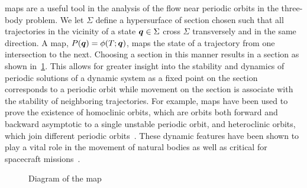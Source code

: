 \documentclass[smallcondensed]{svjour3}
\begin{document}
\Poincare maps are a useful tool in the analysis of the flow near periodic orbits in the three-body problem.
We let \( \Sigma \) define a hypersurface of section chosen such that all trajectories in the vicinity of a state \( \bm{q} \in \Sigma \) cross \( \Sigma \) transversely and in the same direction.
A \Poincare map, \( P(\bm{q}) = \phi(T;\bm{q}) \), maps the state of a trajectory from one intersection to the next.
Choosing a section in this manner results in a \Poincare section as shown in~\cref{fig:poincare_map}.
This allows for greater insight into the stability and dynamics of periodic solutions of a dynamic system as a fixed point on the \Poincare section corresponds to a periodic orbit while movement on the section is associate with the stability of neighboring trajectories. 
For example, \Poincare maps have been used to prove the existence of homoclinic orbits, which are orbits both forward and backward asymptotic to a single unstable periodic orbit, and heteroclinic orbits, which join different periodic orbits~\cite{conley1968,koon2000b}.
These dynamic features have been shown to play a vital role in the movement of natural bodies as well as critical for spacecraft missions~\cite{gomez2001,lo1997}.
\begin{figure}
        \centering
        \begin{scaletikzpicturetowidth}{0.5\textwidth}
    \end{scaletikzpicturetowidth}
        \caption{Diagram of the \Poincare map\label{fig:poincare_map}}
\end{figure}
\end{document}
